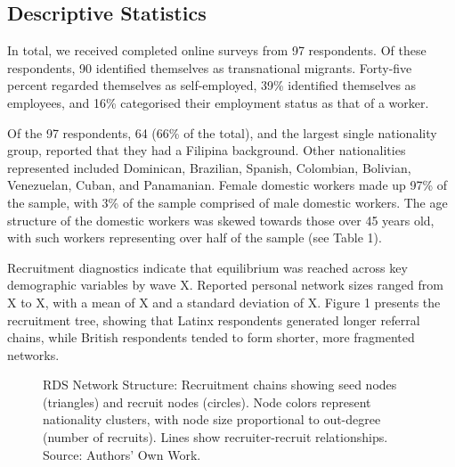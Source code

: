 \documentclass[
  12pt,
  letterpaper,
  DIV=11,
  numbers=noendperiod]{scrartcl}
\theoremstyle{plain}
\theoremstyle{definition}
\begin{document}
\subsection{Descriptive Statistics}\label{descriptive-statistics}

In total, we received completed online surveys from 97 respondents. Of
these respondents, 90 identified themselves as transnational migrants.
Forty-five percent regarded themselves as self-employed, 39\% identified
themselves as employees, and 16\% categorised their employment status as
that of a worker.

Of the 97 respondents, 64 (66\% of the total), and the largest single
nationality group, reported that they had a Filipina background. Other
nationalities represented included Dominican, Brazilian, Spanish,
Colombian, Bolivian, Venezuelan, Cuban, and Panamanian. Female domestic
workers made up 97\% of the sample, with 3\% of the sample comprised of
male domestic workers. The age structure of the domestic workers was
skewed towards those over 45 years old, with such workers representing
over half of the sample (see Table 1).

Recruitment diagnostics indicate that equilibrium was reached across key
demographic variables by wave X. Reported personal network sizes ranged
from X to X, with a mean of X and a standard deviation of X. Figure 1
presents the recruitment tree, showing that Latinx respondents generated
longer referral chains, while British respondents tended to form
shorter, more fragmented networks.

\begin{figure}[H]


\caption{\label{fig-rds-network}RDS Network Structure: Recruitment
chains showing seed nodes (triangles) and recruit nodes (circles). Node
colors represent nationality clusters, with node size proportional to
out-degree (number of recruits). Lines show recruiter-recruit
relationships. Source: Authors' Own Work.}

\end{figure}%
\end{document}
